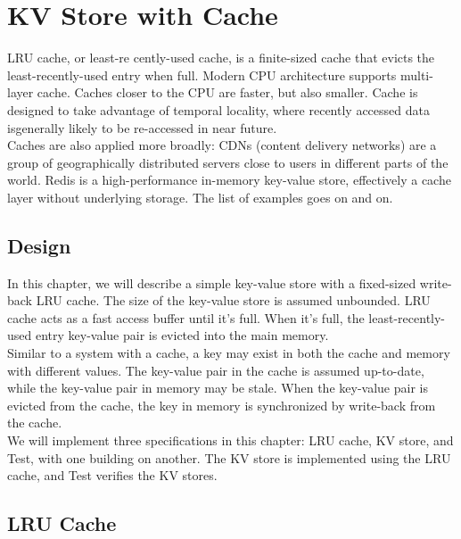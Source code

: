 % 

\usetikzlibrary{arrows.meta} %

\chapter{KV Store with Cache}

LRU cache, or least-re cently-used cache, is a finite-sized cache that evicts 
the least-recently-used entry when full. Modern CPU architecture supports
multi-layer cache. Caches closer to the CPU are faster, but also smaller. Cache is 
designed to take advantage of temporal locality, where recently accessed data isgenerally likely to be re-accessed in near future.\\

Caches are also applied more broadly: CDNs (content delivery
networks) are a group of geographically distributed servers close to
users in different parts of the world. Redis is a high-performance in-memory
key-value store, effectively a cache layer without underlying storage. The list of
examples goes on and on.

\section{Design}

In this chapter, we will describe a simple key-value store with a fixed-sized 
write-back LRU cache. The size of the key-value store is assumed unbounded. LRU
cache acts as a fast access buffer until it's full. When it's full, the
least-recently-used entry key-value pair is evicted into the main memory.\\

Similar to a system with a cache, a key may exist in both the cache and memory
with different values. The key-value pair in the cache is assumed up-to-date,
while the key-value pair in memory may be stale. When the key-value pair is
evicted from the cache, the key in memory is synchronized by write-back from
the cache.\\

We will implement three specifications in this chapter: LRU cache, KV store, and
Test, with one building on another. The KV store is implemented using the LRU
cache, and Test verifies the KV stores.

\section{LRU Cache}

